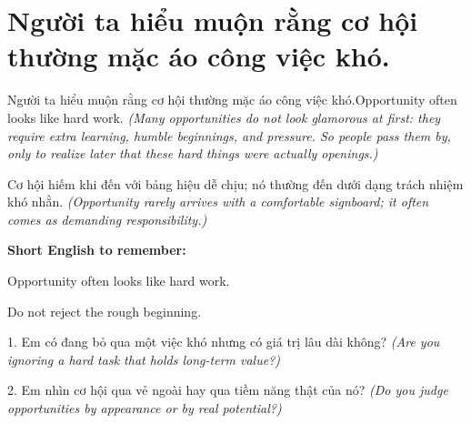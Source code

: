 \section{Người ta hiểu muộn rằng cơ hội thường mặc áo công việc khó.}
\begin{truyen}{Người ta hiểu muộn rằng cơ hội thường mặc áo công việc khó.}{Opportunity often looks like hard work.}
\textit{(Many opportunities do not look glamorous at first: they require extra learning, humble beginnings, and pressure. So people pass them by, only to realize later that these hard things were actually openings.)}
\end{truyen}
\begin{baihoc}
Cơ hội hiếm khi đến với bảng hiệu dễ chịu; nó thường đến dưới dạng trách nhiệm khó nhằn.
\textit{(Opportunity rarely arrives with a comfortable signboard; it often comes as demanding responsibility.)}
\end{baihoc}
\begin{ghinhoanh}
\textbf{Short English to remember:}

Opportunity often looks like hard work.

Do not reject the rough beginning.
\end{ghinhoanh}
\begin{tuhocnhanh}
1. Em có đang bỏ qua một việc khó nhưng có giá trị lâu dài không? \textit{(Are you ignoring a hard task that holds long-term value?)}

2. Em nhìn cơ hội qua vẻ ngoài hay qua tiềm năng thật của nó? \textit{(Do you judge opportunities by appearance or by real potential?)}
\end{tuhocnhanh}
\ngancach